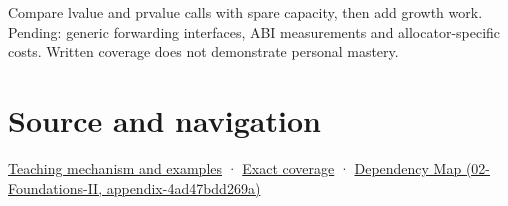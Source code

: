 Compare lvalue and prvalue calls with spare capacity, then add growth work. Pending: generic forwarding interfaces, ABI measurements and allocator-specific costs. Written coverage does not demonstrate personal mastery.

\section{Source and navigation}\label{appendix-d5908f75721f-source-and-navigation}

\href{Continuous\%20Notes/Computing\%20Foundations\%20-\%20From\%20Bits\%20to\%20C++\%20and\%20Systems\%20APIs\#A\%20value\%20crosses\%20the\%20function\%20boundary}{Teaching mechanism and examples} · \hyperref[appendix-fd090d982a15-m009---parts-127-147]{Exact coverage} · \href{../02-Foundations-II/main.pdf\#nameddest=appendix-4ad47bdd269a}{Dependency Map (02-Foundations-II, appendix-4ad47bdd269a)}
